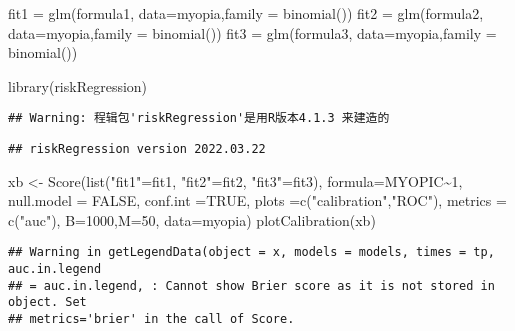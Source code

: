 \documentclass[]{ctexbook}
\newenvironment{Shaded}{\begin{snugshade}}{\end{snugshade}}
\newcommand{\AttributeTok}[1]{\textcolor[rgb]{0.77,0.63,0.00}{#1}}
\newcommand{\ConstantTok}[1]{\textcolor[rgb]{0.00,0.00,0.00}{#1}}
\newcommand{\DecValTok}[1]{\textcolor[rgb]{0.00,0.00,0.81}{#1}}
\newcommand{\FunctionTok}[1]{\textcolor[rgb]{0.00,0.00,0.00}{#1}}
\newcommand{\NormalTok}[1]{#1}
\newcommand{\OtherTok}[1]{\textcolor[rgb]{0.56,0.35,0.01}{#1}}
\newcommand{\SpecialCharTok}[1]{\textcolor[rgb]{0.00,0.00,0.00}{#1}}
\newcommand{\StringTok}[1]{\textcolor[rgb]{0.31,0.60,0.02}{#1}}
\begin{document}
\begin{Shaded}
\begin{Highlighting}[]
\NormalTok{fit1 }\OtherTok{=} \FunctionTok{glm}\NormalTok{(formula1, }\AttributeTok{data=}\NormalTok{myopia,}\AttributeTok{family =} \FunctionTok{binomial}\NormalTok{())}
\NormalTok{fit2 }\OtherTok{=} \FunctionTok{glm}\NormalTok{(formula2, }\AttributeTok{data=}\NormalTok{myopia,}\AttributeTok{family =} \FunctionTok{binomial}\NormalTok{())}
\NormalTok{fit3 }\OtherTok{=} \FunctionTok{glm}\NormalTok{(formula3, }\AttributeTok{data=}\NormalTok{myopia,}\AttributeTok{family =} \FunctionTok{binomial}\NormalTok{())}


\FunctionTok{library}\NormalTok{(riskRegression)}
\end{Highlighting}
\end{Shaded}

\begin{verbatim}
## Warning: 程辑包'riskRegression'是用R版本4.1.3 来建造的
\end{verbatim}

\begin{verbatim}
## riskRegression version 2022.03.22
\end{verbatim}

\begin{Shaded}
\begin{Highlighting}[]
\NormalTok{xb }\OtherTok{\textless{}{-}} \FunctionTok{Score}\NormalTok{(}\FunctionTok{list}\NormalTok{(}\StringTok{"fit1"}\OtherTok{=}\NormalTok{fit1,}
                 \StringTok{"fit2"}\OtherTok{=}\NormalTok{fit2,}
                 \StringTok{"fit3"}\OtherTok{=}\NormalTok{fit3),}
            \AttributeTok{formula=}\NormalTok{MYOPIC}\SpecialCharTok{\textasciitilde{}}\DecValTok{1}\NormalTok{,}
            \AttributeTok{null.model =} \ConstantTok{FALSE}\NormalTok{,}
            \AttributeTok{conf.int =}\ConstantTok{TRUE}\NormalTok{,}
            \AttributeTok{plots =}\FunctionTok{c}\NormalTok{(}\StringTok{"calibration"}\NormalTok{,}\StringTok{"ROC"}\NormalTok{),}
            \AttributeTok{metrics =} \FunctionTok{c}\NormalTok{(}\StringTok{"auc"}\NormalTok{),}
            \AttributeTok{B=}\DecValTok{1000}\NormalTok{,}\AttributeTok{M=}\DecValTok{50}\NormalTok{,}
            \AttributeTok{data=}\NormalTok{myopia)}
\FunctionTok{plotCalibration}\NormalTok{(xb)}
\end{Highlighting}
\end{Shaded}

\begin{verbatim}
## Warning in getLegendData(object = x, models = models, times = tp, auc.in.legend
## = auc.in.legend, : Cannot show Brier score as it is not stored in object. Set
## metrics='brier' in the call of Score.
\end{verbatim}
\end{document}
